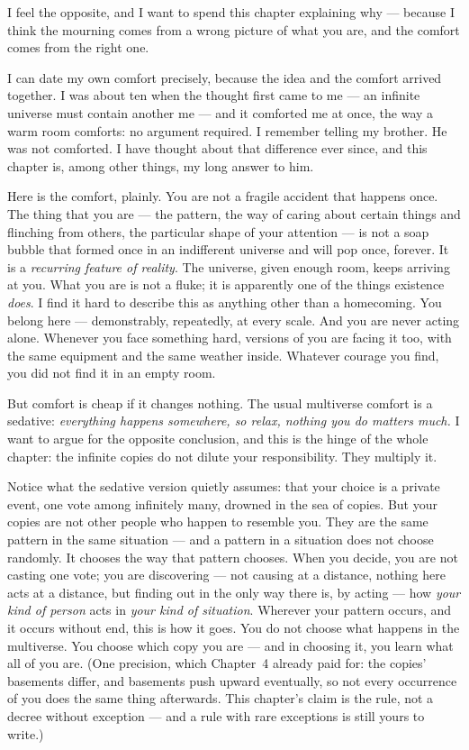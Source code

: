 \documentclass[fontsize=11pt,paper=a4,pagesize=auto,parskip=half-]{scrbook}
\begin{document}
I feel the opposite, and I want to spend this chapter explaining why --- because I think the mourning comes from a wrong picture of what you are, and the comfort comes from the right one.

I can date my own comfort precisely, because the idea and the comfort arrived together. I was about ten when the thought first came to me --- an infinite universe must contain another me --- and it comforted me at once, the way a warm room comforts: no argument required. I remember telling my brother. He was not comforted. I have thought about that difference ever since, and this chapter is, among other things, my long answer to him.

Here is the comfort, plainly. You are not a fragile accident that happens once. The thing that you are --- the pattern, the way of caring about certain things and flinching from others, the particular shape of your attention --- is not a soap bubble that formed once in an indifferent universe and will pop once, forever. It is a \emph{recurring feature of reality}. The universe, given enough room, keeps arriving at you. What you are is not a fluke; it is apparently one of the things existence \emph{does}. I find it hard to describe this as anything other than a homecoming. You belong here --- demonstrably, repeatedly, at every scale. And you are never acting alone. Whenever you face something hard, versions of you are facing it too, with the same equipment and the same weather inside. Whatever courage you find, you did not find it in an empty room.

But comfort is cheap if it changes nothing. The usual multiverse comfort is a sedative: \emph{everything happens somewhere, so relax, nothing you do matters much.} I want to argue for the opposite conclusion, and this is the hinge of the whole chapter: the infinite copies do not dilute your responsibility. They multiply it.

Notice what the sedative version quietly assumes: that your choice is a private event, one vote among infinitely many, drowned in the sea of copies. But your copies are not other people who happen to resemble you. They are the same pattern in the same situation --- and a pattern in a situation does not choose randomly. It chooses the way that pattern chooses. When you decide, you are not casting one vote; you are discovering --- not causing at a distance, nothing here acts at a distance, but finding out in the only way there is, by acting --- how \emph{your kind of person} acts in \emph{your kind of situation}. Wherever your pattern occurs, and it occurs without end, this is how it goes. You do not choose what happens in the multiverse. You choose which copy you are --- and in choosing it, you learn what all of you are. (One precision, which Chapter~4 already paid for: the copies' basements differ, and basements push upward eventually, so not every occurrence of you does the same thing afterwards. This chapter's claim is the rule, not a decree without exception --- and a rule with rare exceptions is still yours to write.)
\end{document}
